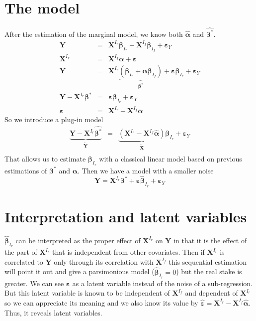 \documentclass[11pt,a4paper]{report}
\begin{document}
	\section{The model}
		After the estimation of the marginal model, we know both $\hat{\boldsymbol{\alpha}}$ and $\hat{\boldsymbol{\beta}^*}$.
		\begin{eqnarray}
			\boldsymbol{Y}&=& \boldsymbol{X}^{I_r}\boldsymbol{\beta}_{I_r}+\boldsymbol{X}^{I_f}\boldsymbol{\beta}_{I_f}+\boldsymbol{\varepsilon}_Y \\
			\boldsymbol{X}^{I_r}&=&\boldsymbol{X}^{I_f}\boldsymbol{\alpha}+\boldsymbol{\varepsilon} \\
			\boldsymbol{Y}&=& \boldsymbol{X}^{I_r}\underbrace{(\boldsymbol{\beta}_{I_r}+\boldsymbol{\alpha}\boldsymbol{\beta}_{I_f})}_{\boldsymbol{\beta}^*}+\boldsymbol{\varepsilon}\boldsymbol{\beta}_{I_r}+\boldsymbol{\varepsilon}_Y \\
			\boldsymbol{Y}- \boldsymbol{X}^{I_r}\boldsymbol{\beta}^*&=&\boldsymbol{\varepsilon}\boldsymbol{\beta}_{I_r}+\boldsymbol{\varepsilon}_Y \\
			\boldsymbol{\varepsilon}&=&\boldsymbol{X}^{I_r}-\boldsymbol{X}^{I_f}\boldsymbol{\alpha}
		\end{eqnarray}		 
		So we introduce a plug-in model
		\begin{eqnarray}
			\underbrace{\boldsymbol{Y}- \boldsymbol{X}^{I_r}\hat{\boldsymbol{\beta}^*}}_{\tilde{\boldsymbol{Y}}}&=&\underbrace{(\boldsymbol{X}^{I_r}-\boldsymbol{X}^{I_f}\hat{\boldsymbol{\alpha}})}_{\tilde{\boldsymbol{X}}}\boldsymbol{\beta}_{I_r}+\boldsymbol{\varepsilon}_Y \\
		\end{eqnarray}
		That allows us to estimate $\boldsymbol{\beta}_{I_r}$ with a classical linear model based on previous estimations of $\boldsymbol{\beta}^*$ and $\boldsymbol{\alpha}$.
		Then we have a model with a smaller noise
		\begin{equation}
			\boldsymbol{Y}= \boldsymbol{X}^{I_r}\boldsymbol{\beta}^* + \boldsymbol{\varepsilon}\hat{\boldsymbol{\beta}}_{I_r}+\boldsymbol{\varepsilon}_Y 
		\end{equation}
	\section{Interpretation and latent variables}
			$\hat{\boldsymbol{\beta}}_{I_r}$ can be interpreted as the proper effect of $\boldsymbol{X}^{I_r}$ on $\boldsymbol{Y}$ in that it is the effect of the part of $\boldsymbol{X}^{I_r}$ that is independent from other covariates. Then if $\boldsymbol{X}^{I_r}$ is correlated to $\boldsymbol{Y}$ only through its correlation with $\boldsymbol{X}^{I_f}$ this sequential estimation will point it out and give a parsimonious model ($\hat{\boldsymbol{\beta}}_{I_r}=0$) but the real stake is greater. We can see $\boldsymbol{\varepsilon}$ as a latent variable instead of the noise of a sub-regression. But this latent variable is known to be independent of $\boldsymbol{X}^{I_f}$ and dependent of $\boldsymbol{X}^{I_r}$ so we can appreciate its meaning and we also know its value by $\hat{\boldsymbol{\varepsilon}}=\boldsymbol{X}^{I_r}-\boldsymbol{X}^{I_f}\hat{\boldsymbol{\alpha}}$. Thus, it reveals latent variables.
			
\end{document}
